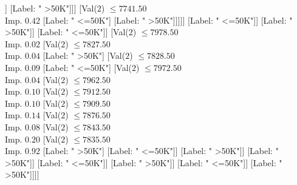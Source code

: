 \documentclass[margin=10pt]{standalone}
\begin{document}
\begin{forest}
																																							[Label: " >50K"]
																																							[Val($2$) $ \leq 7630.50$ \\ Imp. $0.02$
																																								[Val($2$) $ \leq 7610.50$ \\ Imp. $0.46$
																																									[Label: " >50K"]
																																									[Label: " <=50K"]]
																																								[Label: " >50K"]]]
																																						[Val($2$) $ \leq 7741.50$ \\ Imp. $0.42$
																																							[Label: " <=50K"]
																																							[Label: " >50K"]]]]]
																																			[Label: " <=50K"]]
																																		[Label: " >50K"]]
																																	[Label: " <=50K"]]
																																[Val($2$) $ \leq 7978.50$ \\ Imp. $0.02$
																																	[Val($2$) $ \leq 7827.50$ \\ Imp. $0.04$
																																		[Label: " >50K"]
																																		[Val($2$) $ \leq 7828.50$ \\ Imp. $0.09$
																																			[Label: " <=50K"]
																																			[Val($2$) $ \leq 7972.50$ \\ Imp. $0.04$
																																				[Val($2$) $ \leq 7962.50$ \\ Imp. $0.10$
																																					[Val($2$) $ \leq 7912.50$ \\ Imp. $0.10$
																																						[Val($2$) $ \leq 7909.50$ \\ Imp. $0.14$
																																							[Val($2$) $ \leq 7876.50$ \\ Imp. $0.08$
																																								[Val($2$) $ \leq 7843.50$ \\ Imp. $0.20$
																																									[Val($2$) $ \leq 7835.50$ \\ Imp. $0.92$
																																										[Label: " >50K"]
																																										[Label: " <=50K"]]
																																									[Label: " >50K"]]
																																								[Label: " >50K"]]
																																							[Label: " <=50K"]]
																																						[Label: " >50K"]]
																																					[Label: " <=50K"]]
																																				[Label: " >50K"]]]]

\end{forest}
\end{document}
